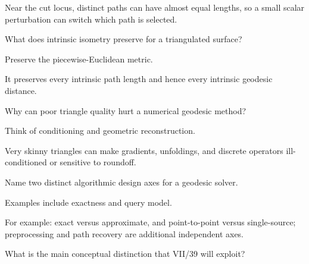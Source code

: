 \begin{solution}
Near the cut locus, distinct paths can have almost equal lengths, so a small scalar perturbation can switch which path is selected.
\end{solution}

\begin{exercise}\label{exr:vii38-21}
What does intrinsic isometry preserve for a triangulated surface?
\end{exercise}

\begin{hint}
Preserve the piecewise-Euclidean metric.
\end{hint}

\begin{solution}
It preserves every intrinsic path length and hence every intrinsic geodesic distance.
\end{solution}

\begin{exercise}\label{exr:vii38-22}
Why can poor triangle quality hurt a numerical geodesic method?
\end{exercise}

\begin{hint}
Think of conditioning and geometric reconstruction.
\end{hint}

\begin{solution}
Very skinny triangles can make gradients, unfoldings, and discrete operators ill-conditioned or sensitive to roundoff.
\end{solution}

\begin{exercise}\label{exr:vii38-23}
Name two distinct algorithmic design axes for a geodesic solver.
\end{exercise}

\begin{hint}
Examples include exactness and query model.
\end{hint}

\begin{solution}
For example: exact versus approximate, and point-to-point versus single-source; preprocessing and path recovery are additional independent axes.
\end{solution}

\begin{exercise}\label{exr:vii38-24}
What is the main conceptual distinction that VII/39 will exploit?
\end{exercise}

